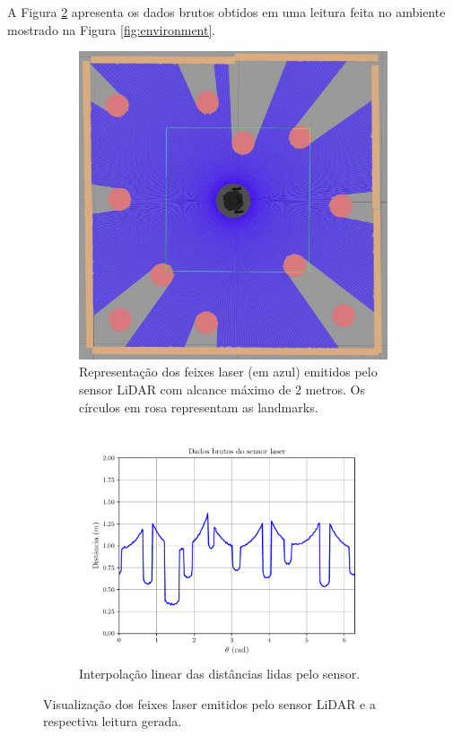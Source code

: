 A Figura \ref{fig:sensor-raw-data} apresenta os dados brutos obtidos em uma 
leitura feita no ambiente mostrado na Figura \ref{fig:environment}.
\begin{figure}[]
  \centering
  \begin{subfigure}{0.39\textwidth}
    \includegraphics[width=\textwidth]{figs/sensor-simulation-view-tiny.png}
    \caption{Representação dos feixes laser (em azul) emitidos pelo sensor LiDAR com 
    alcance máximo de 2 metros. Os círculos em rosa representam as landmarks.}
    \label{fig:laser-beams-visualization}
  \end{subfigure}
  \hfill
  \begin{subfigure}{0.60\textwidth}
    \includegraphics[width=\textwidth]{figs/raw_sensor_data.pdf}
    \caption{Interpolação linear das distâncias lidas pelo sensor.}
    \label{fig:sensor-raw-data}
  \end{subfigure}
  \caption{Visualização dos feixes laser emitidos pelo sensor LiDAR e a 
  respectiva leitura gerada.}
  \label{fig:sensor-visualization-and-reading}
\end{figure}

